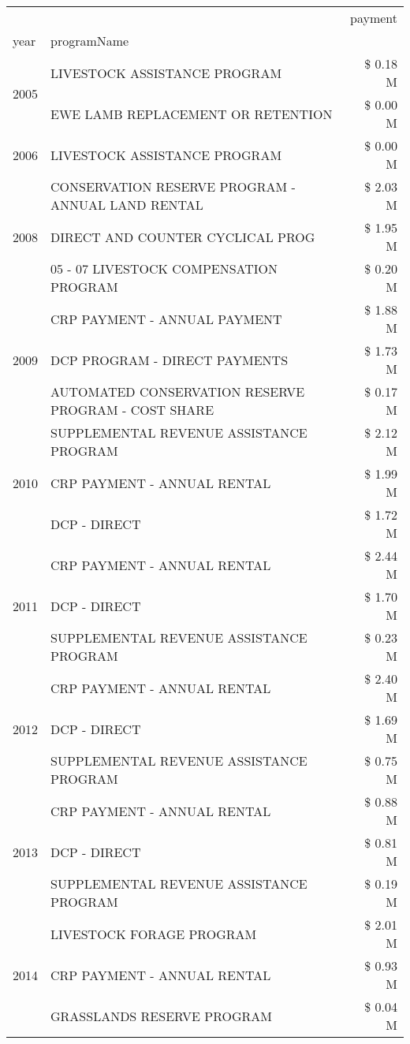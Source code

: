 \begin{tabular}{llr}
\toprule
 &  & payment \\
year & programName &  \\
\midrule
\multirow[t]{2}{*}{2005} & LIVESTOCK ASSISTANCE PROGRAM & \$ 0.18 M \\
 & EWE LAMB REPLACEMENT OR RETENTION & \$ 0.00 M \\
\cline{1-3}
2006 & LIVESTOCK ASSISTANCE PROGRAM & \$ 0.00 M \\
\cline{1-3}
\multirow[t]{3}{*}{2008} & CONSERVATION RESERVE PROGRAM - ANNUAL LAND RENTAL & \$ 2.03 M \\
 & DIRECT AND COUNTER CYCLICAL PROG & \$ 1.95 M \\
 & 05 - 07 LIVESTOCK COMPENSATION PROGRAM & \$ 0.20 M \\
\cline{1-3}
\multirow[t]{3}{*}{2009} & CRP PAYMENT - ANNUAL PAYMENT & \$ 1.88 M \\
 & DCP PROGRAM - DIRECT PAYMENTS & \$ 1.73 M \\
 & AUTOMATED CONSERVATION RESERVE PROGRAM - COST SHARE & \$ 0.17 M \\
\cline{1-3}
\multirow[t]{3}{*}{2010} & SUPPLEMENTAL REVENUE ASSISTANCE PROGRAM & \$ 2.12 M \\
 & CRP PAYMENT - ANNUAL RENTAL & \$ 1.99 M \\
 & DCP - DIRECT & \$ 1.72 M \\
\cline{1-3}
\multirow[t]{3}{*}{2011} & CRP PAYMENT - ANNUAL RENTAL & \$ 2.44 M \\
 & DCP - DIRECT & \$ 1.70 M \\
 & SUPPLEMENTAL REVENUE ASSISTANCE PROGRAM & \$ 0.23 M \\
\cline{1-3}
\multirow[t]{3}{*}{2012} & CRP PAYMENT - ANNUAL RENTAL & \$ 2.40 M \\
 & DCP - DIRECT & \$ 1.69 M \\
 & SUPPLEMENTAL REVENUE ASSISTANCE PROGRAM & \$ 0.75 M \\
\cline{1-3}
\multirow[t]{3}{*}{2013} & CRP PAYMENT - ANNUAL RENTAL & \$ 0.88 M \\
 & DCP - DIRECT & \$ 0.81 M \\
 & SUPPLEMENTAL REVENUE ASSISTANCE PROGRAM & \$ 0.19 M \\
\cline{1-3}
\multirow[t]{3}{*}{2014} & LIVESTOCK FORAGE PROGRAM & \$ 2.01 M \\
 & CRP PAYMENT - ANNUAL RENTAL & \$ 0.93 M \\
 & GRASSLANDS RESERVE PROGRAM & \$ 0.04 M \\

\end{tabular}

